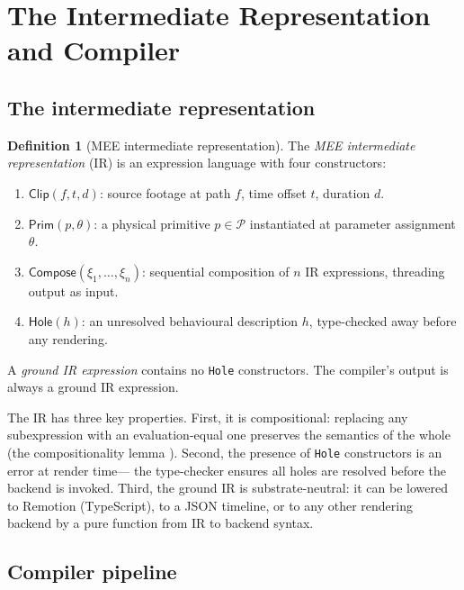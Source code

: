 \documentclass[twocolumn,11pt,a4paper]{article}
\theoremstyle{mee}
\theoremstyle{definition}
\newtheorem{definition}[theorem]{Definition}
\theoremstyle{remark}
\newcommand{\Phys}{\mathcal{P}}
\begin{document}
\section{The Intermediate Representation and Compiler}
\label{sec:compiler}

\subsection{The intermediate representation}

\begin{definition}[MEE intermediate representation]
\label{def:ir}
The \emph{MEE intermediate representation} (IR) is an expression language
with four constructors:
\begin{enumerate}[label=(\roman*),leftmargin=1.8em,itemsep=1pt]
\item $\mathsf{Clip}(f, t, d)$: source footage at path $f$, time offset
  $t$, duration $d$.
\item $\mathsf{Prim}(p,\theta)$: a physical primitive $p\in\Phys$
  instantiated at parameter assignment $\theta$.
\item $\mathsf{Compose}(\xi_1,\dots,\xi_n)$: sequential composition of
  $n$ IR expressions, threading output as input.
\item $\mathsf{Hole}(h)$: an unresolved behavioural description $h$,
  type-checked away before any rendering.
\end{enumerate}
A \emph{ground IR expression} contains no \texttt{Hole} constructors. The
compiler's output is always a ground IR expression.
\end{definition}

The IR has three key properties. First, it is compositional: replacing any
subexpression with an evaluation-equal one preserves the semantics of the
whole (the compositionality lemma \citep{scott1970,plotkin1977}). Second,
the presence of \texttt{Hole} constructors is an error at render time---
the type-checker ensures all holes are resolved before the backend is
invoked. Third, the ground IR is substrate-neutral: it can be lowered to
Remotion (TypeScript), to a JSON timeline, or to any other rendering
backend by a pure function from IR to backend syntax.

\subsection{Compiler pipeline}
\end{document}
